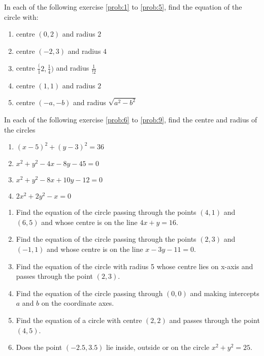 In each of the following exercise \ref{prob:1} to \ref{prob:5}, find the equation of the circle with:
\begin{enumerate}[label=\arabic*.,ref=\thesubsection.\theenumi]
\item centre $(0,2)$ and radius $2$ \label{prob:1}
\item centre $(-2,3)$ and radius $4$
\item centre $\frac({1}{2},\frac{1}{4})$ and radius $\frac {1}{!2}$
\item centre $(1,1)$ and radius $2$
\item centre $(-a,-b)$ and radius $\sqrt{a^2-b^2}$  \label{prob:5}
\end{enumerate}
In each of the following exercise \ref{prob:6} to \ref{prob:9}, find the centre and radius of the circles
\begin{enumerate}[resume]
\item $(x-5)^2+(y-3)^2=36$ \label{prob:6}
\item $x^2+y^2-4x-8y-45=0$
\item $x^2+y^2-8x+10y-12=0$
\item $2x^2+2y^2-x=0$ \label{prob:9}
\end{enumerate}
\begin{enumerate}[resume]
\item Find the equation of the circle passing through the points $(4,1)$ and $(6,5)$ and whose centre is on the line $4x+y=16$.
\item Find the equation of the circle passing through the points $(2,3)$ and $(-1,1)$ and whose centre is on the line $x-3y-11=0$.
\item Find the equation of the circle with radius 5 whose centre lies on x-axis and passes through the point $(2,3)$.
\item Find the equation of the circle passing through $(0,0)$ and making intercepts $a$ and $b$ on the coordinate axes.
\item Find the equation of a circle with centre $(2,2)$ and passes through the point $(4,5)$.
\item Does the point $(-2.5,3.5)$ lie inside, outside or on the circle $x^2+y^2=25$.
\end{enumerate}


